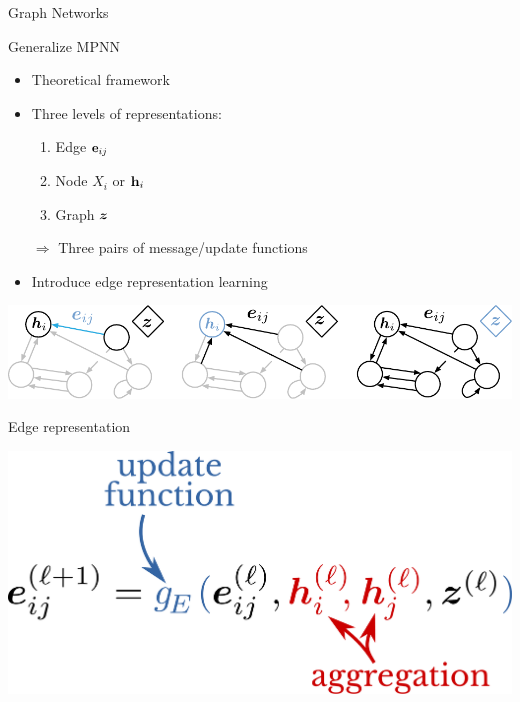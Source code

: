 \documentclass[11pt]{beamer}
\begin{document}
\begin{frame}{Graph Networks}

  \begin{block}{Generalize MPNN}
    \begin{itemize}
    \item Theoretical framework
    \item Three levels of representations:
      \begin{enumerate}
      \item Edge $ {\mathbf{e}}_{ij}$
      \item Node $X_i$ or ${\mathbf{h}}_i$
      \item Graph $ {\boldsymbol{z}}$
      \end{enumerate}
    \item[$\Rightarrow$] Three pairs of message/update functions
    \item Introduce edge representation learning
    \end{itemize}
    
  \end{block}

  \begin{center}
    \includegraphics[width=\textwidth]{gn}
  \end{center}
  
    
\end{frame}


\begin{frame}{Edge representation}

 
    \begin{center}
      \includegraphics[width=\textwidth]{eij_gn}
    \end{center}
\end{frame}
\end{document}
